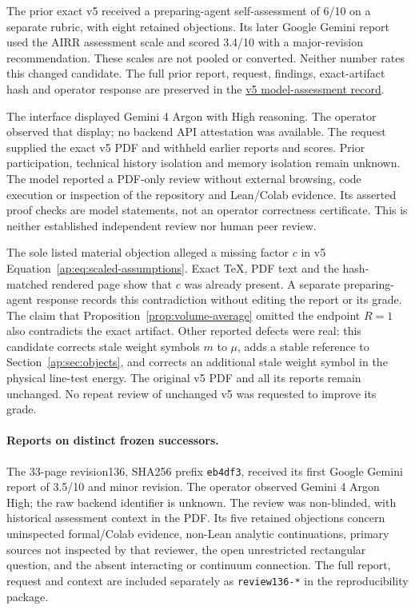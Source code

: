 \documentclass[11pt]{article}
\begin{document}
The prior exact v5 received a preparing-agent self-assessment of 6/10 on a
separate rubric, with eight retained objections. Its later Google Gemini report
used the AIRR assessment scale and scored 3.4/10 with a major-revision
recommendation. These scales are not pooled or converted. Neither number rates
this changed candidate. The full prior report, request, findings, exact-artifact
hash and operator response are preserved in the
\href{https://airr.science/papers/ARR-2026-7EPM3V3DP796BBRR/versions/v5/\#model-assessments}{v5 model-assessment record}.

The interface displayed Gemini 4 Argon with High reasoning. The operator
observed that display; no backend API attestation was available. The request
supplied the exact v5 PDF and withheld earlier reports and scores. Prior
participation, technical history isolation and memory isolation remain unknown.
The model reported a PDF-only review without external browsing, code execution
or inspection of the repository and Lean/Colab evidence. Its asserted proof
checks are model statements, not an operator correctness certificate. This is
neither established independent review nor human peer review.

The sole listed material objection alleged a missing factor $c$ in v5
Equation~\eqref{ap:eq:scaled-assumptions}. Exact TeX, PDF text and the hash-matched
rendered page show that $c$ was already present. A separate preparing-agent
response records this contradiction without editing the report or its grade.
The claim that Proposition~\ref{prop:volume-average} omitted the endpoint $R=1$
also contradicts the exact artifact. Other reported defects were real: this
candidate corrects stale weight symbols $m$ to $\mu$, adds a stable reference to
Section~\ref{ap:sec:objects}, and corrects an additional stale weight symbol in
the physical line-test energy. The original v5 PDF and all its reports remain
unchanged. No repeat review of unchanged v5 was requested to improve its grade.

\paragraph{Reports on distinct frozen successors.}
The 33-page revision136, SHA256 prefix \texttt{eb4df3}, received its
first Google Gemini report of 3.5/10 and minor revision. The operator
observed Gemini 4 Argon High; the raw backend identifier is unknown.
The review was non-blinded, with historical assessment context in the PDF.
Its five retained objections concern uninspected formal/Colab evidence,
non-Lean analytic continuations, primary sources not inspected by that
reviewer, the open unrestricted rectangular question, and the absent
interacting or continuum connection. The full report, request and context
are included separately as \texttt{review136-*} in the reproducibility package.
\end{document}
